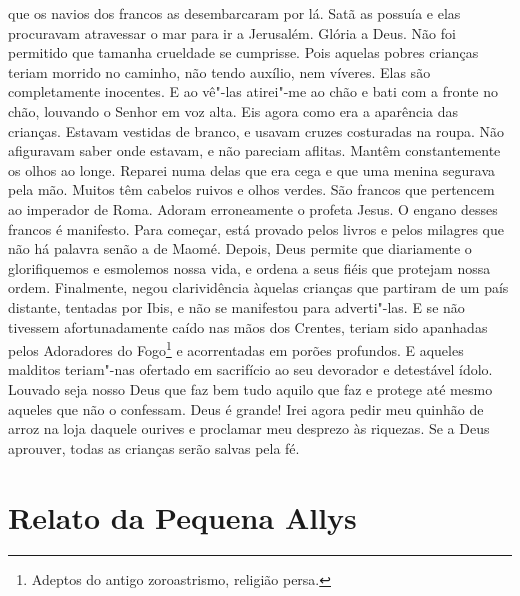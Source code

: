 que os navios dos francos as desembarcaram por lá. Satã as possuía e elas
procuravam atravessar o mar para ir a Jerusalém. Glória a Deus. Não foi
permitido que tamanha crueldade se cumprisse. Pois aquelas pobres crianças
teriam morrido no caminho, não tendo auxílio, nem víveres. Elas são
completamente inocentes. E ao vê"-las atirei"-me ao chão e bati com a fronte
no chão, louvando o Senhor em voz alta. Eis agora como era a aparência das
crianças. Estavam vestidas de branco, e usavam cruzes costuradas na roupa.
Não afiguravam saber onde estavam, e não pareciam aflitas. Mantêm
constantemente os olhos ao longe. Reparei numa delas que era cega e que
uma menina segurava pela mão. Muitos têm cabelos ruivos e olhos verdes.
São francos que pertencem ao imperador de Roma. Adoram erroneamente o
profeta Jesus. O engano desses francos é manifesto. Para começar, está
provado pelos livros e pelos milagres que não há palavra senão a de Maomé.
Depois, Deus permite que diariamente o glorifiquemos e esmolemos nossa
vida, e ordena a seus fiéis que protejam nossa ordem. Finalmente, negou
clarividência àquelas crianças que partiram de um país distante, tentadas
por Ibis, e não se manifestou para adverti"-las. E se não tivessem
afortunadamente caído nas mãos dos Crentes, teriam sido apanhadas pelos
Adoradores do Fogo\footnote{ Adeptos do antigo zoroastrismo, religião
persa.} e acorrentadas em porões profundos. E aqueles malditos teriam"-nas
ofertado em sacrifício ao seu devorador e detestável ídolo. Louvado seja
nosso Deus que faz bem tudo aquilo que faz e protege até mesmo aqueles que
não o confessam. Deus é grande! Irei agora pedir meu quinhão de arroz na
loja daquele ourives e proclamar meu desprezo às riquezas. Se a Deus
aprouver, todas as crianças serão salvas pela fé.

\chapter{Relato da Pequena Allys}

